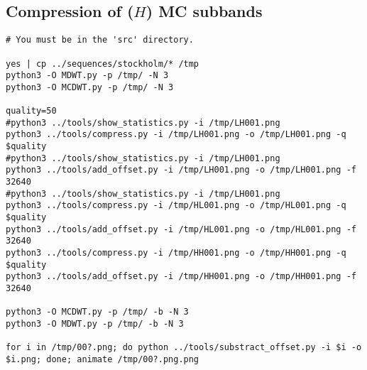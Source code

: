\subsection{Compression of ($H$) MC subbands}
\begin{verbatim}
# You must be in the 'src' directory.

yes | cp ../sequences/stockholm/* /tmp
python3 -O MDWT.py -p /tmp/ -N 3
python3 -O MCDWT.py -p /tmp/ -N 3

quality=50
#python3 ../tools/show_statistics.py -i /tmp/LH001.png
python3 ../tools/compress.py -i /tmp/LH001.png -o /tmp/LH001.png -q $quality
#python3 ../tools/show_statistics.py -i /tmp/LH001.png
python3 ../tools/add_offset.py -i /tmp/LH001.png -o /tmp/LH001.png -f 32640
#python3 ../tools/show_statistics.py -i /tmp/LH001.png
python3 ../tools/compress.py -i /tmp/HL001.png -o /tmp/HL001.png -q $quality
python3 ../tools/add_offset.py -i /tmp/HL001.png -o /tmp/HL001.png -f 32640
python3 ../tools/compress.py -i /tmp/HH001.png -o /tmp/HH001.png -q $quality
python3 ../tools/add_offset.py -i /tmp/HH001.png -o /tmp/HH001.png -f 32640

python3 -O MCDWT.py -p /tmp/ -b -N 3
python3 -O MDWT.py -p /tmp/ -b -N 3

for i in /tmp/00?.png; do python ../tools/substract_offset.py -i $i -o $i.png; done; animate /tmp/00?.png.png
\end{verbatim}

